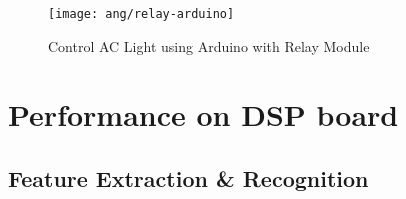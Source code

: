 \begin{figure}[H]
\centering
\texttt{[image: ang/relay-arduino]}
\caption{Control AC Light using Arduino with Relay Module \cite{relay-arduino}}
\label{relay-arduino}
\end{figure}


\section{Performance on DSP board}

\subsection{Feature Extraction \& Recognition}


